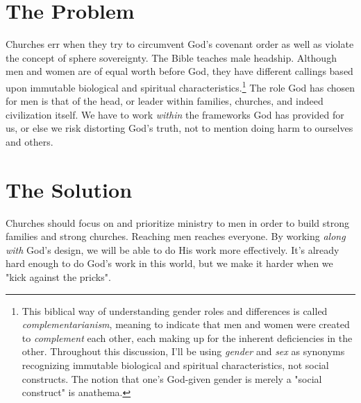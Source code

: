 \section{The Problem}
Churches err when they try to circumvent God's covenant order as well as violate the concept of sphere sovereignty.  The Bible teaches male headship. Although men and women are of equal worth before God, they have different callings based upon immutable biological and spiritual characteristics.\footnote{This biblical way of understanding gender roles and differences is called \textit{complementarianism}, meaning to indicate that men and women were created to \textit{complement} each other, each making up for the inherent deficiencies in the other.  Throughout this discussion, I'll be using \textit{gender} and \textit{sex} as synonyms recognizing immutable biological and spiritual characteristics, not social constructs.  The notion that one's God-given gender is merely a "social construct" is anathema.}  The role God has chosen for men is that of the head, or leader within families, churches, and indeed civilization itself.  We have to work \textit{within} the frameworks God has provided for us, or else we risk distorting God's truth, not to mention doing harm to ourselves and others.

\ifdefined\embedversion\newpage\fi
\section{The Solution}
Churches should focus on and prioritize ministry to men in order to build strong families and strong churches.  Reaching men reaches everyone.  By working \textit{along with} God's design, we will be able to do His work more effectively.  It's already hard enough to do God's work in this world, but we make it harder when we "kick against the pricks".  


